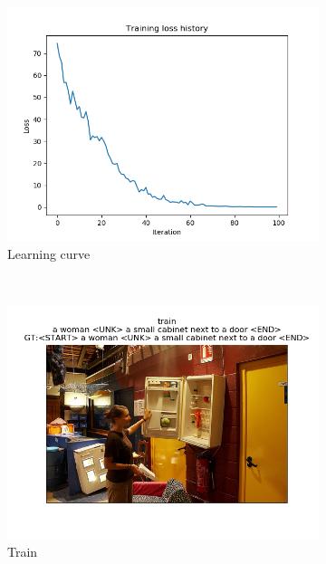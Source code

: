 \documentclass[12pt]{article}
\begin{document}
\begin{figure}[htbp]
    \centering
    \begin{subfigure}[t]{0.48\textwidth}
        \centering
        \includegraphics[trim={3in 0in 3in 1in},scale=0.7]{./Homework2/output/hw2p5_fig06.png}
        \caption{Learning curve}
    \label{hw2p5f}
    \end{subfigure}\\
    \begin{subfigure}[t]{0.48\textwidth}
        \centering
        \includegraphics[trim={3in 0in 3in 0in},scale=0.5]{./Homework2/output/hw2p5_fig07.png}
        \caption{Train}
    \label{hw2p5g}
    \end{subfigure}
    \begin{subfigure}[t]{0.48\textwidth}

\end{subfigure}
\end{figure}
\end{document}
